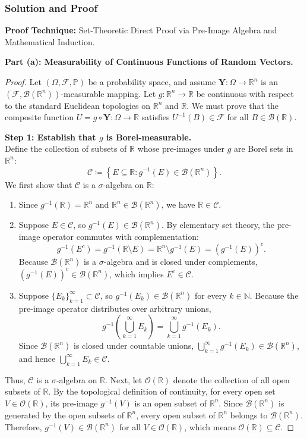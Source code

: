 \documentclass[11pt, letterpaper]{article}
\theoremstyle{definition}
\theoremstyle{remark}
\newcommand{\R}{\mathbb{R}}
\newcommand{\N}{\mathbb{N}}
\newcommand{\Prob}{\mathbb{P}}
\newcommand{\F}{\mathcal{F}}
\begin{document}
\subsubsection*{Solution and Proof}

\textbf{Proof Technique:} Set-Theoretic Direct Proof via Pre-Image Algebra and Mathematical Induction.

\textbf{Part (a): Measurability of Continuous Functions of Random Vectors.}
\begin{proof}
Let $(\Omega, \F, \Prob)$ be a probability space, and assume $\mathbf{Y} : \Omega \to \R^n$ is an $(\F, \mathcal{B}(\R^n))$-measurable mapping. Let $g : \R^n \to \R$ be continuous with respect to the standard Euclidean topologies on $\R^n$ and $\R$. We must prove that the composite function $U = g \circ \mathbf{Y} : \Omega \to \R$ satisfies $U^{-1}(B) \in \F$ for all $B \in \mathcal{B}(\R)$.

\textbf{Step 1: Establish that $g$ is Borel-measurable.} \\ \relax
Define the collection of subsets of $\R$ whose pre-images under $g$ are Borel sets in $\R^n$:
\[
    \mathcal{C} \coloneqq \left\{ E \subseteq \R : g^{-1}(E) \in \mathcal{B}(\R^n) \right\}.
\]
We first show that $\mathcal{C}$ is a $\sigma$-algebra on $\R$:
\begin{enumerate}[label=(\roman*)]
    \item Since $g^{-1}(\R) = \R^n$ and $\R^n \in \mathcal{B}(\R^n)$, we have $\R \in \mathcal{C}$.
    \item Suppose $E \in \mathcal{C}$, so $g^{-1}(E) \in \mathcal{B}(\R^n)$. By elementary set theory, the pre-image operator commutes with complementation:
    \[
        g^{-1}(E^c) = g^{-1}(\R \setminus E) = \R^n \setminus g^{-1}(E) = \left(g^{-1}(E)\right)^c.
    \]
    Because $\mathcal{B}(\R^n)$ is a $\sigma$-algebra and is closed under complements, $\left(g^{-1}(E)\right)^c \in \mathcal{B}(\R^n)$, which implies $E^c \in \mathcal{C}$.
    \item Suppose $\{E_k\}_{k=1}^{\infty} \subset \mathcal{C}$, so $g^{-1}(E_k) \in \mathcal{B}(\R^n)$ for every $k \in \N$. Because the pre-image operator distributes over arbitrary unions,
    \[
        g^{-1}\left(\bigcup_{k=1}^{\infty} E_k\right) = \bigcup_{k=1}^{\infty} g^{-1}(E_k).
    \]
    Since $\mathcal{B}(\R^n)$ is closed under countable unions, $\bigcup_{k=1}^{\infty} g^{-1}(E_k) \in \mathcal{B}(\R^n)$, and hence $\bigcup_{k=1}^{\infty} E_k \in \mathcal{C}$.
\end{enumerate}
Thus, $\mathcal{C}$ is a $\sigma$-algebra on $\R$. Next, let $\mathcal{O}(\R)$ denote the collection of all open subsets of $\R$. By the topological definition of continuity, for every open set $V \in \mathcal{O}(\R)$, its pre-image $g^{-1}(V)$ is an open subset of $\R^n$. Since $\mathcal{B}(\R^n)$ is generated by the open subsets of $\R^n$, every open subset of $\R^n$ belongs to $\mathcal{B}(\R^n)$. Therefore, $g^{-1}(V) \in \mathcal{B}(\R^n)$ for all $V \in \mathcal{O}(\R)$, which means $\mathcal{O}(\R) \subseteq \mathcal{C}$.


\end{proof}
\end{document}
